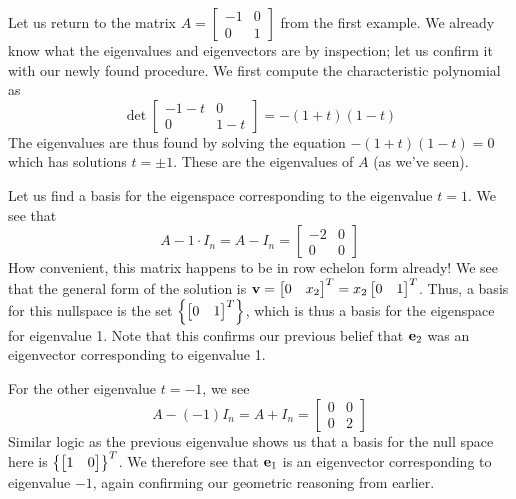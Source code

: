 \documentclass[mathshortcuts, colorful]{notes}
\begin{document}
    \begin{example}
        Let us return to the matrix $A = \begin{bmatrix} -1 & 0 \\ 0 & 1 \end{bmatrix}$ from the first example. We already know what the eigenvalues and eigenvectors are by inspection; let us confirm it with our newly found procedure. We first compute the characteristic polynomial as 
        \begin{equation*}
            \det \begin{bmatrix}
                -1 -t & 0 \\ 0 & 1 - t
            \end{bmatrix} = -(1 + t)(1 - t)
        \end{equation*}
        The eigenvalues are thus found by solving the equation $-(1+t)(1-t) = 0$ which has solutions $t = \pm 1$. These are the eigenvalues of $A$ (as we've seen). 

        Let us find a basis for the eigenspace corresponding to the eigenvalue $t = 1$. We see that 
        \begin{equation*}
            A - 1 \cdot I_n = A - I_n = \begin{bmatrix}
                -2 & 0 \\ 0 & 0 
            \end{bmatrix}
        \end{equation*}
        How convenient, this matrix happens to be in row echelon form already! We see that the general form of the solution is $\mathbf{v} = \begin{bmatrix} 0 & x_2 \end{bmatrix}^T = x_2 \begin{bmatrix} 0 & 1 \end{bmatrix}^T$. Thus, a basis for this nullspace is the set $\left\{ \begin{bmatrix} 0 & 1 \end{bmatrix}^T \right\}$, which is thus a basis for the eigenspace for eigenvalue 1. Note that this confirms our previous belief that $\mathbf{e}_2$ was an eigenvector corresponding to eigenvalue 1. 

        For the other eigenvalue $t = -1$, we see 
        \begin{equation*}
            A - (-1)I_n = A + I_n = \begin{bmatrix}
                0 & 0 \\ 0 & 2
            \end{bmatrix}
        \end{equation*}
        Similar logic as the previous eigenvalue shows us that a basis for the null space here is $\left\{ \begin{bmatrix} 1 & 0 \end{bmatrix} \right\}^T$. We therefore see that $\mathbf{e}_1$ is an eigenvector corresponding to eigenvalue $-1$, again confirming our geometric reasoning from earlier.
    \end{example}
\end{document}
